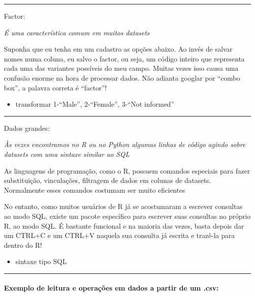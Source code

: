 \documentclass[11pt]{article}
\providecommand{\tightlist}{%
      \setlength{\itemsep}{0pt}\setlength{\parskip}{0pt}}
\begin{document}
    \begin{center}\rule{0.5\linewidth}{\linethickness}\end{center}

Factor:

\emph{É uma característica comum em muitos datasets}

Suponha que eu tenha em um cadastro as opções abaixo. Ao invés de salvar
nomes numa coluna, eu salvo o factor, ou seja, um código inteiro que
representa cada uma das variantes possíveis do meu campo. Muitas vezes
isso causa uma confusão enorme na hora de processar dados. Não adianta
googlar por ``combo box'', a palavra correta é ``factor''!

\begin{itemize}
\tightlist
\item
  transformar 1-``Male'', 2-``Female'', 3-``Not informed''
\end{itemize}

    \begin{center}\rule{0.5\linewidth}{\linethickness}\end{center}

Dados grandes:

\emph{Às vezes encontramos no R ou no Python algumas linhas de código
agindo sobre datasets com uma sintaxe similar ao SQL}

As linguagens de programação, como o R, possuem comandos especiais para
fazer substituição, vinculações, filtragem de dados em colunas de
datasets. Normalmente esses comandos costumam ser muito eficientes

No entanto, como muitos usuários de R já se acostumaram a escrever
consultas ao modo SQL, existe um pacote específico para escrever suas
consultas no próprio R, ao modo SQL. É bastante funcional e na maioria
das vezes, basta depois dar um CTRL+C e um CTRL+V naquela sua consulta
já escrita e trazê-la para dentro do R!

\begin{itemize}
\tightlist
\item
  sintaxe tipo SQL
\end{itemize}

    \begin{center}\rule{0.5\linewidth}{\linethickness}\end{center}

\hypertarget{exemplo-de-leitura-e-operauxe7uxf5es-em-dados-a-partir-de-um-.csv}{%
\paragraph{Exemplo de leitura e operações em dados a partir de um
.csv:}\label{exemplo-de-leitura-e-operauxe7uxf5es-em-dados-a-partir-de-um-.csv}}
\end{document}
